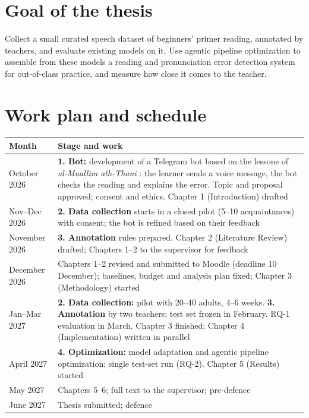 \documentclass[a4paper,14pt]{extarticle}
\begin{document}
\section{Goal of the thesis}

Collect a small curated speech dataset of beginners' primer reading, annotated by teachers, and evaluate
existing models on it. Use agentic pipeline optimization to assemble from these models a reading and
pronunciation error detection system for out-of-class practice, and measure how close it comes to the
teacher.

\section{Work plan and schedule}

\begin{table}[ht]
\centering\small
\begin{tabularx}{\linewidth}{@{}P{3.2cm}L@{}}
\toprule
Month & Stage and work \\
\midrule
October 2026 & \textbf{1. Bot:} development of a Telegram bot based on the lessons of \emph{al-Muallim
  ath-Thani} \cite{SRC-040}: the learner sends a voice message, the bot checks the reading and explains the
  error. Topic and proposal approved; consent and ethics. Chapter 1 (Introduction) drafted \\
Nov--Dec 2026 & \textbf{2. Data collection} starts in a closed pilot (5--10 acquaintances) with consent; the
  bot is refined based on their feedback \\
November 2026 & \textbf{3. Annotation} rules prepared. Chapter 2 (Literature Review) drafted; Chapters 1--2
  to the supervisor for feedback \\
December 2026 & Chapters 1--2 revised and submitted to Moodle (deadline 10 December); baselines, budget and
  analysis plan fixed; Chapter 3 (Methodology) started \\
Jan--Mar 2027 & \textbf{2. Data collection:} pilot with 20--40 adults, 4--6 weeks. \textbf{3. Annotation} by
  two teachers; test set frozen in February. RQ-1 evaluation in March. Chapter 3 finished; Chapter 4
  (Implementation) written in parallel \\
April 2027 & \textbf{4. Optimization:} model adaptation and agentic pipeline optimization; single test-set
  run (RQ-2). Chapter 5 (Results) started \\
May 2027 & Chapters 5--6; full text to the supervisor; pre-defence \\
June 2027 & Thesis submitted; defence \\
\bottomrule
\end{tabularx}
\end{table}

\printbibliography[heading=bibintoc,title={References}]
\end{document}
